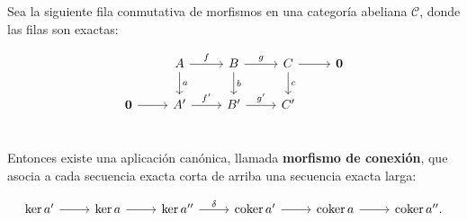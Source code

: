 \begin{lema}
    Sea la siguiente fila conmutativa de morfismos en una categoría abeliana $\mathscr{C}$, donde las filas son exactas:

    \begin{equation}
        \begin{tikzcd}
            & A \arrow{r}{f} \arrow{d}{a} & B \arrow{r}{g} \arrow{d}{b} & C \arrow{r}{} \arrow{d}{c} & \boldsymbol{0} \\
            \boldsymbol{0} \arrow{r} & A' \arrow{r}{f'} & B' \arrow{r}{g'} & C' &\\
        \end{tikzcd}
    \end{equation}
    
    Entonces existe una aplicación canónica, llamada \textbf{morfismo de conexión}, que asocia a cada secuencia exacta corta de arriba una secuencia exacta larga:

    \begin{equation}
        \begin{tikzcd}
            \ker a' \arrow[r]{r}{} & \ker a \arrow[r]{r}{} & \ker a'' \arrow[r]{r}{\delta} & \operatorname{coker} a' \arrow[r]{r}{} & \operatorname{coker} a \arrow[r]{r}{} & \operatorname{coker} a''.
        \end{tikzcd}
    \end{equation}
    
\end{lema}





\endinput
